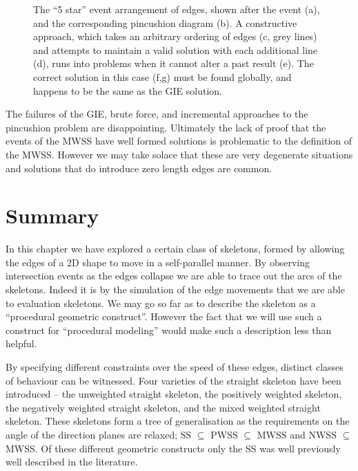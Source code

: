 \begin{figure}
  \centering
  \def\svgwidth{1.0\columnwidth}
  
  \caption[The 5 Star Pincushion]{\label{fig:epp_5_cycle} The ``5 star'' event arrangement of edges, shown after the event (a), and the corresponding pincushion diagram (b). A constructive approach, which takes an arbitrary ordering of edges  (c, grey lines) and attempts to maintain a valid solution with each additional line (d), runs into problems when it cannot alter a past result (e). The correct solution in this case (f,g) must be found globally, and happens to be the same as the GIE solution.}
\end{figure}

The failures of the GIE, brute force, and incremental approaches to the pincushion problem are disappointing. Ultimately the lack of proof that the events of the MWSS have well formed solutions is problematic to the definition of the MWSS. However we may take solace that these are very degenerate situations and solutions that do introduce zero length edges are common.


\FloatBarrier
\section{Summary}

In this chapter we have explored a certain class of skeletons, formed by allowing the edges of a 2D shape to move in a self-parallel manner. By observing intersection events as the edges collapse we are able to trace out the arcs of the skeletons. Indeed it is by the simulation of the edge movements that we are able to evaluation skeletons. We may go so far as to describe the skeleton as a ``procedural geometric construct''. However the fact that we will use such a construct for ``procedural modeling'' would make such a description less than helpful.



By specifying different constraints over the speed of these edges, distinct classes of behaviour can be witnessed. Four varieties of the straight skeleton have been introduced -- the unweighted straight skeleton, the positively weighted skeleton, the negatively weighted straight skeleton, and the mixed weighted straight skeleton. These skeletons form a tree of generalisation as the requirements on the angle of the direction planes are relaxed; SS $\subseteq$ PWSS $\subseteq$ MWSS and NWSS $\subseteq$ MWSS. Of these different geometric constructs only the SS was well previously well described in the literature. 

